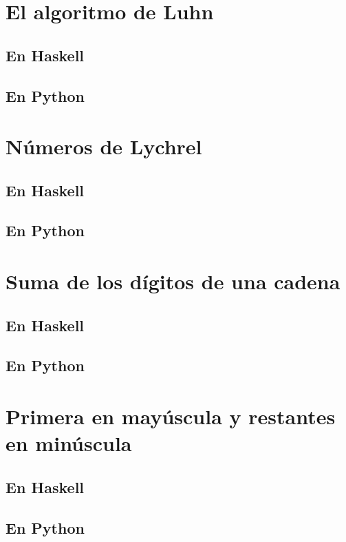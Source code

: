 \documentclass[a4paper,12pt,twoside]{book}
\begin{document}
\section{El algoritmo de Luhn}
\subsection*{En Haskell}
\subsection*{En Python}

\section{Números de Lychrel}
\subsection*{En Haskell}
\subsection*{En Python}

\section{Suma de los dígitos de una cadena}
\subsection*{En Haskell}
\subsection*{En Python}

\section{Primera en mayúscula y restantes en minúscula}
\subsection*{En Haskell}
\subsection*{En Python}
\end{document}
